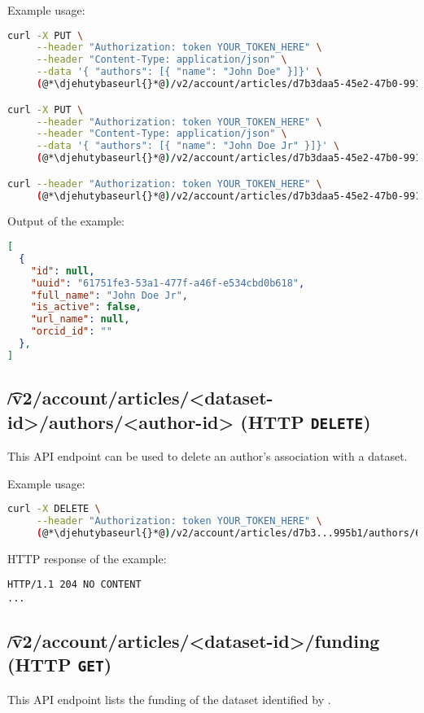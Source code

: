   Example usage:
\begin{lstlisting}[language=bash]
curl -X PUT \
     --header "Authorization: token YOUR_TOKEN_HERE" \
     --header "Content-Type: application/json" \
     --data '{ "authors": [{ "name": "John Doe" }]}' \
     (@*\djehutybaseurl{}*@)/v2/account/articles/d7b3daa5-45e2-47b0-9910-0f7fa6a995b1/authors

curl -X PUT \
     --header "Authorization: token YOUR_TOKEN_HERE" \
     --header "Content-Type: application/json" \
     --data '{ "authors": [{ "name": "John Doe Jr" }]}' \
     (@*\djehutybaseurl{}*@)/v2/account/articles/d7b3daa5-45e2-47b0-9910-0f7fa6a995b1/authors

curl --header "Authorization: token YOUR_TOKEN_HERE" \
     (@*\djehutybaseurl{}*@)/v2/account/articles/d7b3daa5-45e2-47b0-9910-0f7fa6a995b1 | jq
\end{lstlisting}

  Output of the example:
\begin{lstlisting}[language=JSON]
[
  {
    "id": null,
    "uuid": "61751fe3-53a1-477f-a46f-e534cbd0b618",
    "full_name": "John Doe Jr",
    "is_active": false,
    "url_name": null,
    "orcid_id": ""
  },
]
\end{lstlisting}

\subsection{\t{/v2/account/articles/<dataset-id>/authors/<author-id>} (HTTP \texttt{DELETE})}

  This API endpoint can be used to delete an author's association with a dataset.

  Example usage:
\begin{lstlisting}[language=bash]
curl -X DELETE \
     --header "Authorization: token YOUR_TOKEN_HERE" \
     (@*\djehutybaseurl{}*@)/v2/account/articles/d7b3...995b1/authors/6175...0b618
\end{lstlisting}

  HTTP response of the example:
\begin{lstlisting}
HTTP/1.1 204 NO CONTENT
...
\end{lstlisting}

\subsection{\t{/v2/account/articles/<dataset-id>/funding} (HTTP \texttt{GET})}

  This API endpoint lists the funding of the dataset identified by .

